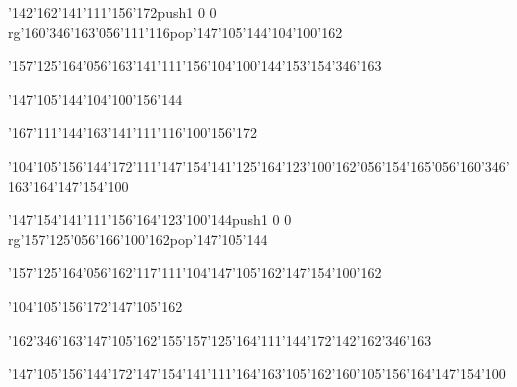 \null\vfill\ipa\centerline{\enskip\char'142\char'162\char'141\char'111\char'156\char'172\enskip\enskip\enskip\enskip\pdfcolorstack\match push{1 0 0 rg}\char'160\char'346\char'163\char'056\char'111\char'116\pdfcolorstack\match pop{}\enskip\enskip\enskip\char'147\char'105\char'144\enskip\char'104\char'100\char'162}\medskip\centerline{\enskip\char'157\char'125\char'164\char'056\char'163\char'141\char'111\char'156\enskip\enskip\enskip\enskip\char'104\char'100\char'144\enskip\enskip\enskip\enskip\enskip\char'153\char'154\char'346\char'163}\medskip\centerline{\enskip\char'147\char'105\char'144\enskip\enskip\enskip\enskip\char'104\char'100\char'156\char'144\enskip\enskip\enskip\enskip\enskip\enskip}\medskip\centerline{\enskip\enskip\enskip\enskip\char'167\char'111\char'144\enskip\enskip\enskip\enskip\enskip\char'163\char'141\char'111\char'116\enskip\char'100\char'156\char'172\enskip\enskip\enskip\enskip\enskip}\medskip\centerline{\enskip\enskip\char'104\char'105\char'156\char'144\char'172\enskip\char'111\enskip\char'147\char'154\char'141\char'125\char'164\enskip\char'123\char'100\char'162\char'056\char'154\char'165\char'056\char'160\char'346\char'163\char'164\enskip\char'147\char'154\char'100}\medskip\vfill\footline{\hfil\tt\folio\hfil}\eject
\null\vfill\ipa\centerline{\enskip\char'147\char'154\char'141\char'111\char'156\char'164\enskip\enskip\enskip\enskip\char'123\char'100\char'144\enskip\enskip\enskip\enskip\pdfcolorstack\match push{1 0 0 rg}\char'157\char'125\char'056\char'166\char'100\char'162\pdfcolorstack\match pop{}\enskip\char'147\char'105\char'144}\medskip\centerline{\enskip\char'157\char'125\char'164\char'056\char'162\char'117\char'111\char'104\enskip\enskip\enskip\enskip\char'147\char'105\char'162\enskip\enskip\enskip\enskip\enskip\char'147\char'154\char'100\char'162}\medskip\centerline{\enskip\enskip\enskip\enskip\enskip\enskip\enskip\enskip\char'104\char'105\char'156\char'172\enskip\enskip\enskip\char'147\char'105\char'162}\medskip\centerline{\enskip\enskip\enskip\enskip\char'162\char'346\char'163\enskip\char'147\char'105\char'162\enskip\char'155\char'157\char'125\char'164\enskip\char'111\char'144\char'172\enskip\char'142\char'162\char'346\char'163}\medskip\centerline{\enskip\enskip\char'147\char'105\char'156\char'144\char'172\enskip\enskip\enskip\char'147\char'154\char'141\char'111\char'164\enskip\char'163\char'105\char'162\enskip\enskip\enskip\char'160\char'105\char'156\char'164\enskip\char'147\char'154\char'100}\medskip\vfill\footline{\hfil\tt\folio\hfil}\eject
